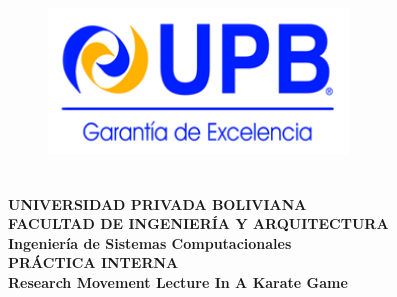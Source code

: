 \begin{titlepage}
\begin{figure}[t!]
	\centering
	\includegraphics[width=8cm,height=5cm,]{./Images/Logo_Upb.png}
\end{figure}
\begin{center}
	\textbf{
		\large{UNIVERSIDAD PRIVADA BOLIVIANA\\
		FACULTAD DE INGENIERÍA Y ARQUITECTURA\\
		Ingeniería de Sistemas Computacionales\\[1cm]}
		\huge{PRÁCTICA INTERNA}\\[2cm]
		\Huge{Research Movement Lecture In A Karate Game}
	}
\end{center}
\end{titlepage}
